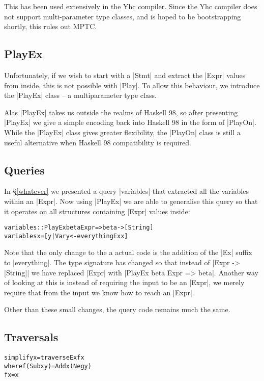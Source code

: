 \documentclass[preprint]{sigplanconf}
\newenvironment{code}{\begin{alltt}\small}{\end{alltt}}
\begin{document}
This has been used extensively in the Yhc compiler. Since the Yhc compiler does not support multi-parameter type classes, and is hoped to be bootstrapping shortly, this rules out MPTC.


\subsection{PlayEx}


Unfortunately, if we wish to start with a |Stmt| and extract the |Expr| values from inside, this is not possible with |Play|. To allow this behaviour, we introduce the |PlayEx| class -- a multiparameter type class.

Alas |PlayEx| takes us outside the realms of Haskell 98, so after presenting |PlayEx| we give a simple encoding back into Haskell 98 in the form of |PlayOn|. While the |PlayEx| class gives greater flexibility, the |PlayOn| class is still a useful alternative when Haskell 98 compatibility is required.

\subsection{Queries}

In \S\ref{whatever} we presented a query |variables| that extracted all the variables within an |Expr|. Now using |PlayEx| we are able to generalise this query so that it operates on all structures containing |Expr| values inside:

\begin{code}
variables :: PlayEx beta Expr => beta -> [String]
variables x = [y | Var y <- everythingEx x]
\end{code}

Note that the only change to the a actual code is the addition of the |Ex| suffix to |everything|. The type signature has changed so that instead of |Expr -> [String]| we have replaced |Expr| with |PlayEx beta Expr => beta|. Another way of looking at this is instead of requiring the input to be an |Expr|, we merely require that from the input we know how to reach an |Expr|.

Other than these small changes, the query code remains much the same.

\subsection{Traversals}

\begin{code}
simplify x = traverseEx f x
    where  f (Sub x y)  = Add x (Neg y)
           f x          = x
\end{code}
\end{document}
